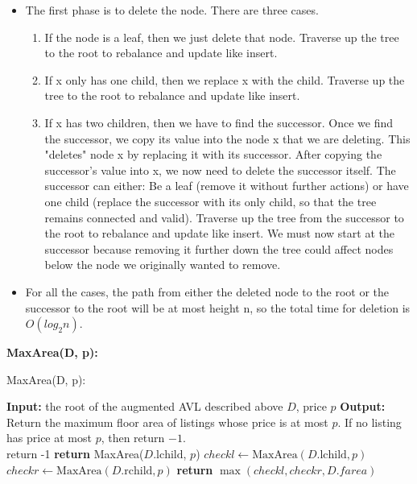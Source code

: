 \documentclass[11pt, a4paper]{article}
\begin{document}
\begin{itemize}
    \item The first phase is to delete the node. There are three cases.
    \begin{enumerate}
    \item If the node is a leaf, then we just delete that node. Traverse up the tree to the root to rebalance and update like insert.
    \item If x only has one child, then we replace x with the child. Traverse up the tree to the root to rebalance and update like insert.
    \item If x has two children, then we have to find the successor. Once we find the successor, we copy its value into the node x that we are deleting. This "deletes" node x by replacing it with its successor. After copying the successor’s value into x, we now need to delete the successor itself. The successor can either: Be a leaf (remove it without further actions) or have one child (replace the successor with its only child, so that the tree remains connected and valid). Traverse up the tree from the successor to the root to rebalance and update like insert. We must now start at the successor because removing it further down the tree could affect nodes below the node we originally wanted to remove.
    \end{enumerate}
    \item For all the cases, the path from either the deleted node to the root or the successor to the root will be at most height n, so the total time for deletion is $O(log_2n)$.

\end{itemize}
\textbf{MaxArea(D, p):} \\

\begin{algorithm} [H]
\caption{MaxArea(D, p):}
\begin{algorithmic}[1]
\State \textbf{Input:} the root of the augmented AVL described above \( D \), price \( p \)
\State \textbf{Output:} Return the maximum floor area of listings whose price is at most $p$. If no listing has price at most $p$, then return $-1$.
\\

    \State return -1
        \State \textbf{return} MaxArea($D.\text{lchild}$, $p$)
\Else
        \State $checkl \gets \text{MaxArea}(D.\text{lchild}, p)$
        \State $checkr \gets \text{MaxArea}(D.\text{rchild}, p)$
        \State \textbf{return} $\max(checkl, checkr, D.farea)$
\EndIf

\end{algorithmic}
\end{algorithm}
\end{document}
